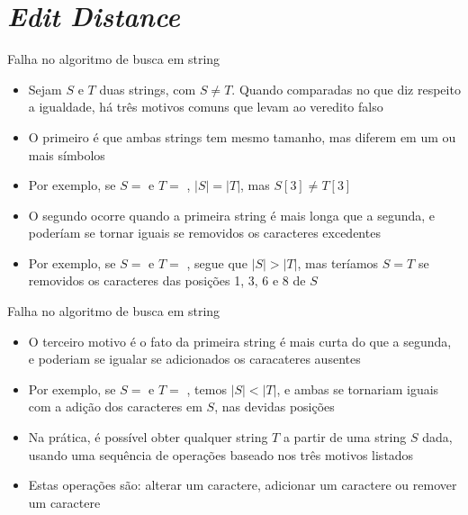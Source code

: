 \section{\it Edit Distance}

\begin{frame}[fragile]{Falha no algoritmo de busca em string}

    \begin{itemize}
        \item  Sejam $S$ e $T$ duas strings, com $S \neq T$. Quando comparadas no que diz respeito
            a igualdade, há três motivos comuns que levam ao veredito falso 

        \item O primeiro é que ambas strings tem mesmo tamanho, mas diferem em um ou mais símbolos

        \item Por exemplo, se $S = $  e $T = $ , 
            $|S| = |T|$, mas $S[3] \neq T[3]$

        \item O segundo ocorre quando a primeira string é mais longa que a segunda, e poderíam se 
            tornar iguais se removidos os caracteres excedentes

        \item Por exemplo, se $S = $  e $T = $ , segue que
            $|S| > |T|$, mas teríamos $S = T$ se removidos os caracteres das posições 
            1, 3, 6 e 8 de $S$
    \end{itemize}

\end{frame}

\begin{frame}[fragile]{Falha no algoritmo de busca em string}

    \begin{itemize}
        \item O terceiro motivo é o fato da primeira string é mais curta do que a segunda, e 
            poderiam se igualar se adicionados os caracateres ausentes

        \item Por exemplo, se $S = $  e $T = $ , temos
            $|S| < |T|$, e ambas se tornariam iguais com a adição dos caracteres 
                 em $S$, nas devidas posições

        \item Na prática, é possível obter qualquer string $T$ a partir de uma string $S$ dada, 
            usando uma sequência de operações baseado nos três motivos listados

        \item Estas operações são: alterar um caractere, adicionar um caractere ou remover um caractere
    \end{itemize}

\end{frame}


